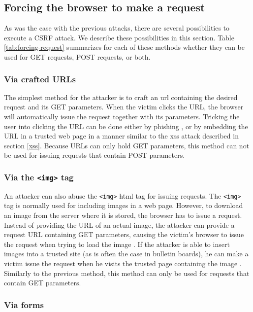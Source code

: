 \subsection{Forcing the browser to make a request}\label{forcing-request}

As was the case with the previous attacks, there are several possibilities to execute a CSRF attack. We describe these possibilities in this section. Table \ref{tab:forcing-request} summarizes for each of these methods whether they can be used for GET requests, POST requests, or both.

\subsubsection{Via crafted URLs}

The simplest method for the attacker is to craft an \gls{url} containing the desired request and its GET parameters. When the victim clicks the URL, the browser will automatically issue the request together with its parameters. Tricking the user into clicking the URL can be done either by phishing \cite{Barth2008}, or by embedding the URL in a trusted web page in a manner similar to the \gls{xss} attack described in section \ref{xss}. Because URLs can only hold GET parameters, this method can not be used for issuing requests that contain POST parameters.

\subsubsection{Via the \texttt{<img>} tag}

An attacker can also abuse the \texttt{<img>} \gls{html} tag for issuing requests. The \texttt{<img>} tag is normally used for including images in a web page. However, to download an image from the server where it is stored, the browser has to issue a request. Instead of providing the URL of an actual image, the attacker can provide a request URL containing GET parameters, causing the victim's browser to issue the request when trying to load the image \cite{Johns2006b}. If the attacker is able to insert images into a trusted site (as is often the case in bulletin boards), he can make a victim issue the request when he visits the trusted page containing the image \cite{Barth2008}. Similarly to the previous method, this method can only be used for requests that contain GET parameters.

\subsubsection{Via forms}

